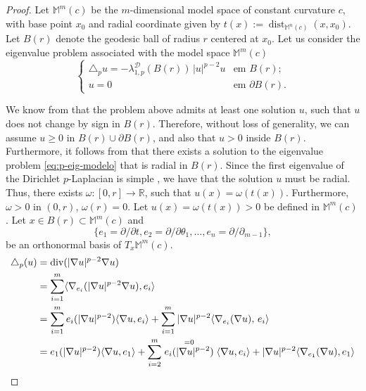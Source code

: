 \documentclass{article}
\newcommand{\diver}{{{\rm{div}}}}
\begin{document}
\begin{proof}
Let $\mathbb{M}^m(c)$ be the $m$-dimensional model space of constant curvature $c$, with base point $x_0$ and radial coordinate given by $t(x):=\operatorname{dist}_{\mathbb{M}^n(c)}(x,x_0).$
Let $B(r)$ denote the geodesic ball of radius $r$ centered at $x_0$. Let us consider the eigenvalue problem associated with the model space $\mathbb{M}^m(c)$
\begin{equation}\label{eq:p-eig-modelo}
\begin{cases}
 \triangle_p u =  - \lambda_{1,p}^{\mathcal{D}}(B(r))\,|u |^{p-2}u 
& \text{em } B(r);\\
u = 0 & \text{em } \partial B(r).
\end{cases}
\end{equation}

We know from \cite[Lemma 5]{lindqvist92} that the problem above admits at least one solution $u$, such that $u$ does not change by sign in $B(r)$. Therefore, without loss of generality, we can assume $u\geq 0$ in $B(r) \cup \partial B(r)$, and also that $u>0$ inside $B(r)$. Furthermore, it follows from \cite[Theorem 1]{Bhattacharya1988} that there exists a solution to the eigenvalue problem \eqref{eq:p-eig-modelo} that is radial in $B(r)$. Since the first eigenvalue of the Dirichlet \(p\)-Laplacian is simple \cite[Theorem 1.3]{lindqvist}, we have that the solution $u$ must be radial. Thus, there exists $\omega:[0,r] \to \mathbb{R}$, such that $u(x) = \omega (t(x)).$ Furthermore, $\omega>0$ in $(0,r)$, $\omega(r)=0$. Let $u(x)=\omega(t(x))>0$ be  defined in $\mathbb{M}^{m}(c)$. Let $x\in B(r)\subset \mathbb{M}^{m}(c)$ and  $$\{e_1=\partial/\partial t, e_2=\partial/\partial\theta_1,\ldots, e_{n}=\partial/\partial_{m-1}\},$$ be an orthonormal basis of $T_x \mathbb{M}^{m}(c)$.
\begin{equation*}
\begin{aligned}
    \triangle_p(u)&= \diver (| \nabla u |^{p-2}\nabla u ) \\
    &= \sum_{i=1}^{m}
    \langle \nabla_{e_i}(|\nabla u|^{p-2}\nabla u), e_i\rangle  \\
    &=  \sum_{i=1}^{m} e_i(| \nabla u |^{p-2})\langle \nabla u, e_i\rangle + \sum_{i=1}^{m}|\nabla u |^{p-2}\langle \nabla_{e_i}( \nabla u),\, e_i\rangle \\
    &=  e_1(| \nabla u |^{p-2})\langle \nabla u, e_1\rangle + \sum_{i=2}^{m} \stackrel{=0}{e_i(| \nabla u |^{p-2})}\langle \nabla u, e_i\rangle + | \nabla u |^{p-2}\langle \nabla_{e_1}( \nabla u), e_1\rangle \\ 

\end{aligned}
\end{equation*}
\end{proof}
\end{document}
